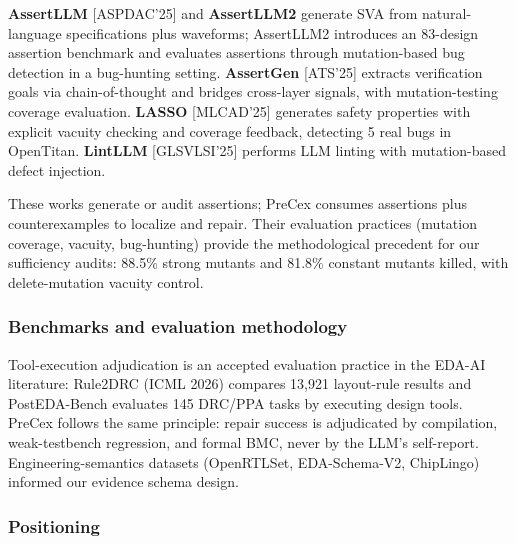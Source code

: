 \documentclass[
  11pt,
]{article}
\begin{document}
\textbf{AssertLLM} {[}ASPDAC'25{]} and \textbf{AssertLLM2} generate SVA from natural-language specifications plus waveforms; AssertLLM2 introduces an 83-design assertion benchmark and evaluates assertions through mutation-based bug detection in a bug-hunting setting. \textbf{AssertGen} {[}ATS'25{]} extracts verification goals via chain-of-thought and bridges cross-layer signals, with mutation-testing coverage evaluation. \textbf{LASSO} {[}MLCAD'25{]} generates safety properties with explicit vacuity checking and coverage feedback, detecting 5 real bugs in OpenTitan. \textbf{LintLLM} {[}GLSVLSI'25{]} performs LLM linting with mutation-based defect injection.

These works generate or audit assertions; PreCex consumes assertions plus counterexamples to localize and repair. Their evaluation practices (mutation coverage, vacuity, bug-hunting) provide the methodological precedent for our sufficiency audits: 88.5\% strong mutants and 81.8\% constant mutants killed, with delete-mutation vacuity control.

\subsubsection{Benchmarks and evaluation methodology}\label{benchmarks-and-evaluation-methodology}

Tool-execution adjudication is an accepted evaluation practice in the EDA-AI literature: Rule2DRC (ICML 2026) compares 13,921 layout-rule results and PostEDA-Bench evaluates 145 DRC/PPA tasks by executing design tools. PreCex follows the same principle: repair success is adjudicated by compilation, weak-testbench regression, and formal BMC, never by the LLM's self-report. Engineering-semantics datasets (OpenRTLSet, EDA-Schema-V2, ChipLingo) informed our evidence schema design.

\subsubsection{Positioning}\label{positioning}
\end{document}
